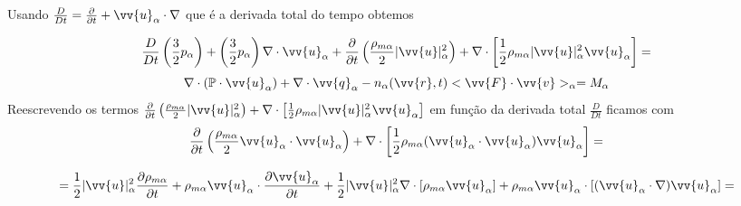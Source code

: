 \documentclass[12pt,oneside,a4paper]{abntex2}
\begin{document}
Usando $\frac{D}{Dt} = \frac{\partial }{\partial t} + \vv{u}_\alpha \cdot \nabla$ que é a derivada total do tempo obtemos

\begin{equation}
\label{eq: p5.1}
\frac{D}{Dt} \left( \frac{3}{2}p_\alpha \right) + \left(\frac{3}{2}p_\alpha \right)  \nabla \cdot \vv{u}_\alpha +  \frac{\partial }{\partial t} \left(\frac{\rho_{m\alpha}}{2} |\vv{u}|^2_\alpha \right) +\nabla \cdot \left[ \frac{1}{2}\rho_{m\alpha}|\vv{u}|^2_\alpha \vv{u}_\alpha \right] = 
\end{equation}
\begin{equation*}
\nabla \cdot (\mathbb{P} \cdot \vv{u}_\alpha) + \nabla \cdot \vv{q}_\alpha-n_\alpha(\vv{r},t) <\vv{F} \cdot \vv{v}>_\alpha = M_\alpha
\end{equation*}
Reescrevendo os termos $\frac{\partial }{\partial t} \left(\frac{\rho_{m\alpha}}{2} |\vv{u}|^2_\alpha \right) +\nabla \cdot \left[ \frac{1}{2}\rho_{m\alpha}|\vv{u}|^2_\alpha \vv{u}_ \alpha \right]$ em função da derivada total $\frac{D}{Dt}$ ficamos com
\begin{equation}
\frac{\partial }{\partial t} \left(\frac{\rho_{m\alpha}}{2}\vv{u}_\alpha \cdot \vv{u}_\alpha \right) +\nabla \cdot \left[ \frac{1}{2}\rho_{m\alpha}(\vv{u}_\alpha \cdot \vv{u}_ \alpha) \vv{u}_\alpha \right] = 
\end{equation}

\begin{equation*}
= \frac{1}{2}|\vv{u}|^2_\alpha \frac{\partial \rho_{m\alpha} }{\partial t} + \rho_{m\alpha} \vv{u}_\alpha \cdot \frac{\partial \vv{u}_\alpha}{\partial t} +
\frac{1}{2}|\vv{u}|^2_\alpha \nabla \cdot \left[ \rho_{m\alpha}  \vv{u}_\alpha \right] + \rho_{m\alpha}  \vv{u}_\alpha  \cdot \left[ (\vv{u}_\alpha \cdot \nabla )\vv{u}_\alpha  \right] = 
\end{equation*}
\end{document}
